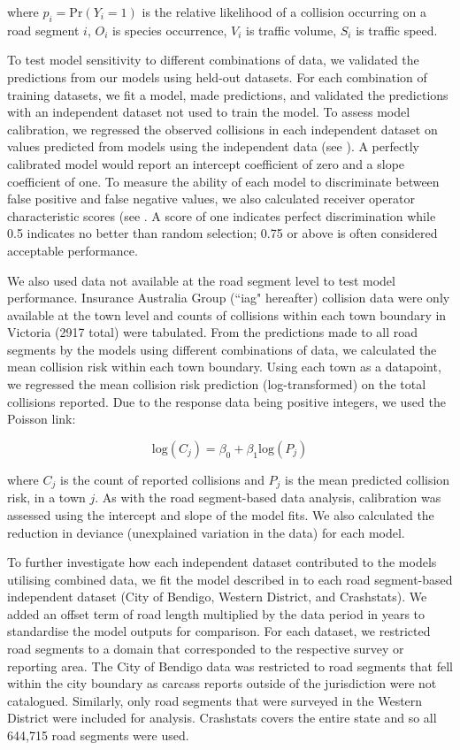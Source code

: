 \noindent where $p_i=\text{Pr}(Y_i=1)$ is the relative likelihood of a collision occurring on a road segment $i$, $O_i$ is species occurrence, $V_i$ is traffic volume, $S_i$ is traffic speed.

To test model sensitivity to different combinations of data, we validated the predictions from our models using held-out datasets. For each combination of training datasets, we fit a model, made predictions, and validated the predictions with an independent dataset not used to train the model. To assess model calibration, we regressed the observed collisions in each independent dataset on values predicted from models using the independent data (see \cite{mill91}). A perfectly calibrated model would report an intercept coefficient of zero and a slope coefficient of one. To measure the ability of each model to discriminate between false positive and false negative values, we also calculated receiver operator characteristic scores (see \cite{metz78}. A score of one indicates perfect discrimination while 0.5 indicates no better than random selection; 0.75 or above is often considered acceptable performance.

We also used data not available at the road segment level to test model performance. Insurance Australia Group (``iag" hereafter) collision data were only available at the town level and counts of collisions within each town boundary in Victoria (2917 total) were tabulated. From the predictions made to all road segments by the models using different combinations of data, we calculated the mean collision risk within each town boundary. Using each town as a datapoint, we regressed the mean collision risk prediction (log-transformed) on the total collisions reported. Due to the response data being positive integers, we used the Poisson link:

\begin{equation} \label{eq:62}
\text{log}(C_j) = \beta_0 + \beta_1\text{log}(P_j)
\end{equation}

\noindent where $C_j$ is the count of reported collisions and $P_j$ is the mean predicted collision risk, in a town $j$. As with the road segment-based data analysis, calibration was assessed using the intercept and slope of the model fits. We also calculated the reduction in deviance (unexplained variation in the data) for each model.

To further investigate how each independent dataset contributed to the models utilising combined data, we fit the model described in  to each road segment-based independent dataset (City of Bendigo, Western District, and Crashstats). We added an offset term of road length multiplied by the data period in years to standardise the model outputs for comparison. For each dataset, we restricted road segments to a domain that corresponded to the respective survey or reporting area. The City of Bendigo data was restricted to road segments that fell within the city boundary as carcass reports outside of the jurisdiction were not catalogued. Similarly, only road segments that were surveyed in the Western District were included for analysis. Crashstats covers the entire state and so all 644,715 road segments were used. 


